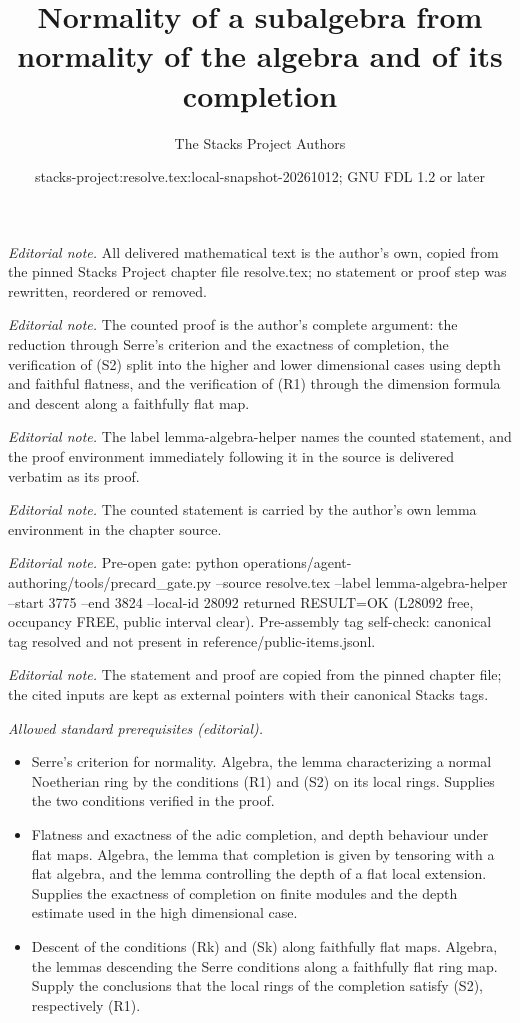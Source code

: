 \documentclass[10pt,a4paper]{amsart}
\title{Normality of a subalgebra from normality of the algebra and of its completion}
\author{The Stacks Project Authors}
\date{stacks-project:resolve.tex:local-snapshot-20261012; GNU FDL 1.2 or later}
\theoremstyle{plain}
\theoremstyle{definition}
\theoremstyle{remark}
\numberwithin{equation}{subsection}
\begin{document}
\maketitle
\noindent\textit{Editorial note.} All delivered mathematical text is the author's own, copied from the pinned Stacks Project chapter file resolve.tex; no statement or proof step was rewritten, reordered or removed.\par\medskip
\noindent\textit{Editorial note.} The counted proof is the author's complete argument: the reduction through Serre's criterion and the exactness of completion, the verification of (S2) split into the higher and lower dimensional cases using depth and faithful flatness, and the verification of (R1) through the dimension formula and descent along a faithfully flat map.\par\medskip
\noindent\textit{Editorial note.} The label lemma-algebra-helper names the counted statement, and the proof environment immediately following it in the source is delivered verbatim as its proof.\par\medskip
\noindent\textit{Editorial note.} The counted statement is carried by the author's own lemma environment in the chapter source.\par\medskip
\noindent\textit{Editorial note.} Pre-open gate: python operations/agent-authoring/tools/precard\_gate.py --source resolve.tex --label lemma-algebra-helper --start 3775 --end 3824 --local-id 28092 returned RESULT=OK (L28092 free, occupancy FREE, public interval clear). Pre-assembly tag self-check: canonical tag resolved and not present in reference/public-items.jsonl.\par\medskip
\noindent\textit{Editorial note.} The statement and proof are copied from the pinned chapter file; the cited inputs are kept as external pointers with their canonical Stacks tags.\par\medskip
\noindent\textit{Allowed standard prerequisites (editorial).}\begin{itemize}
\item Serre's criterion for normality. Algebra, the lemma characterizing a normal Noetherian ring by the conditions (R1) and (S2) on its local rings. Supplies the two conditions verified in the proof.
\item Flatness and exactness of the adic completion, and depth behaviour under flat maps. Algebra, the lemma that completion is given by tensoring with a flat algebra, and the lemma controlling the depth of a flat local extension. Supplies the exactness of completion on finite modules and the depth estimate used in the high dimensional case.
\item Descent of the conditions (Rk) and (Sk) along faithfully flat maps. Algebra, the lemmas descending the Serre conditions along a faithfully flat ring map. Supply the conclusions that the local rings of the completion satisfy (S2), respectively (R1).
\end{itemize}\medskip
\end{document}
